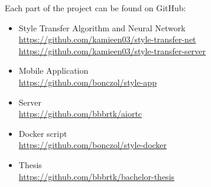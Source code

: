 \documentclass[../Main.tex]{subfiles}
\begin{document}
    Each part of the project can be found on GitHub:

    \begin{itemize}
        \item{
        Style Transfer Algorithm and Neural Network \\
        \url{https://github.com/kamieen03/style-transfer-net}\\
        \url{https://github.com/kamieen03/style-transfer-server}
        }
        \item{ 
        Mobile Application \\
        \url{https://github.com/bonczol/style-app}
            }
        \item {
        Server \\
        \url{https://github.com/bbbrtk/aiortc}
            }
        \item {
        Docker script \\
        \url{https://github.com/bonczol/style-docker}
            }
        \item {
        Thesis \\
        \url{https://github.com/bbbrtk/bachelor-thesis}
        }
    \end{itemize}
\biblio %
\end{document}
